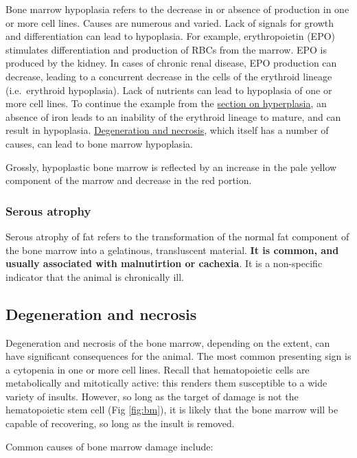 \documentclass[openany]{article}
\begin{document}
Bone marrow hypoplasia refers to the decrease in or absence of
production in one or more cell lines. Causes are numerous and varied.
Lack of signals for growth and differentiation can lead to hypoplasia.
For example, erythropoietin (EPO) stimulates differentiation and
production of RBCs from the marrow. EPO is produced by the kidney. In
cases of chronic renal disease, EPO production can decrease, leading to
a concurrent decrease in the cells of the erythroid lineage
(i.e.~erythroid hypoplasia). Lack of nutrients can lead to hypoplasia of
one or more cell lines. To continue the example from the
\protect\hyperlink{hyperplasia}{section on hyperplasia}, an absence of
iron leads to an inability of the erythroid lineage to mature, and can
result in hypoplasia.
\protect\hyperlink{degeneration-and-necrosis}{Degeneration and
necrosis}, which itself has a number of causes, can lead to bone marrow
hypoplasia.

Grossly, hypoplastic bone marrow is reflected by an increase in the pale
yellow component of the marrow and decrease in the red portion.

\subsubsection{Serous atrophy}\label{serous-atrophy}

Serous atrophy of fat refers to the transformation of the normal fat
component of the bone marrow into a gelatinous, transluscent material.
\textbf{It is common, and usually associated with malnutirtion or
cachexia}. It is a non-specific indicator that the animal is chronically
ill.

\hypertarget{degeneration-and-necrosis}{\subsection{Degeneration and
necrosis}\label{degeneration-and-necrosis}}

Degeneration and necrosis of the bone marrow, depending on the extent,
can have significant consequences for the animal. The most common
presenting sign is a cytopenia in one or more cell lines. Recall that
hematopoietic cells are metabolically and mitotically active: this
renders them susceptible to a wide variety of insults. However, so long
as the target of damage is not the hematopoietic stem cell (Fig
\ref{fig:bm}), it is likely that the bone marrow will be capable of
recovering, so long as the insult is removed.

Common causes of bone marrow damage include:
\end{document}
